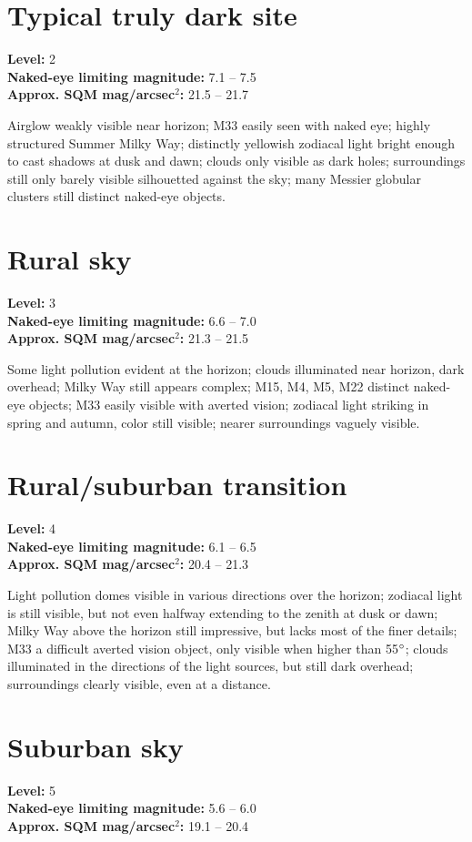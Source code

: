 \section{Typical truly dark site}
\textbf{Level:} 2 \\
\textbf{Naked-eye limiting magnitude:} 7.1 -- 7.5 \\
\textbf{Approx. SQM mag/arcsec$^2$:} 21.5 -- 21.7

Airglow weakly visible near horizon; M33 easily seen with naked eye;
highly structured Summer Milky Way; distinctly yellowish zodiacal
light bright enough to cast shadows at dusk and dawn; clouds only
visible as dark holes; surroundings still only barely visible
silhouetted against the sky; many Messier globular clusters still
distinct naked-eye objects.

\section{Rural sky}
\textbf{Level:} 3 \\
\textbf{Naked-eye limiting magnitude:} 6.6 -- 7.0 \\
\textbf{Approx. SQM mag/arcsec$^2$:} 21.3 -- 21.5

Some light pollution evident at the horizon; clouds illuminated near
horizon, dark overhead; Milky Way still appears complex; M15, M4, M5,
M22 distinct naked-eye objects; M33 easily visible with averted
vision; zodiacal light striking in spring and autumn, color still
visible; nearer surroundings vaguely visible.

\section{Rural/suburban transition}
\textbf{Level:} 4 \\
\textbf{Naked-eye limiting magnitude:} 6.1 -- 6.5 \\
\textbf{Approx. SQM mag/arcsec$^2$:} 20.4 -- 21.3

Light pollution domes visible in various directions over the horizon;
zodiacal light is still visible, but not even halfway extending to the
zenith at dusk or dawn; Milky Way above the horizon still impressive,
but lacks most of the finer details; M33 a difficult averted vision
object, only visible when higher than 55$\degree$; clouds illuminated
in the directions of the light sources, but still dark overhead;
surroundings clearly visible, even at a distance.

\newpage
\section{Suburban sky}
\textbf{Level:} 5 \\
\textbf{Naked-eye limiting magnitude:} 5.6 -- 6.0 \\
\textbf{Approx. SQM mag/arcsec$^2$:} 19.1 -- 20.4

